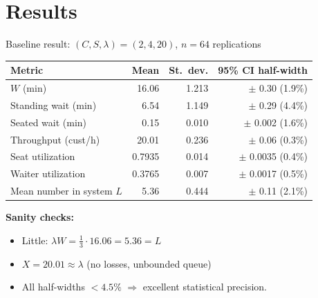 \documentclass[10pt,aspectratio=169]{beamer}
\begin{document}
\section{Results}
\begin{frame}{Baseline result: $(C,S,\lambda) = (2,4,20)$, $n = 64$ replications}
\begin{table}
\centering
\begin{tabular}{l r r r}
\toprule
Metric & Mean & St.\ dev. & 95\% CI half-width \\
\midrule
$W$ (min)                       & 16.06 & 1.213 & $\pm$ 0.30 (1.9\%) \\
Standing wait (min)             &  6.54 & 1.149 & $\pm$ 0.29 (4.4\%) \\
Seated wait (min)               &  0.15 & 0.010 & $\pm$ 0.002 (1.6\%) \\
Throughput (cust/h)             & 20.01 & 0.236 & $\pm$ 0.06 (0.3\%) \\
Seat utilization                & 0.7935 & 0.014 & $\pm$ 0.0035 (0.4\%) \\
Waiter utilization              & 0.3765 & 0.007 & $\pm$ 0.0017 (0.5\%) \\
Mean number in system $L$       &  5.36 & 0.444 & $\pm$ 0.11 (2.1\%) \\
\bottomrule
\end{tabular}
\end{table}

\vspace{0.4cm}
\textbf{Sanity checks:}
\begin{itemize}
  \item Little: $\lambda W = \tfrac{1}{3}\cdot 16.06 = 5.36 = L$ \quad\checkmark
  \item $X = 20.01 \approx \lambda$ \quad (no losses, unbounded queue) \checkmark
  \item All half-widths $< 4.5\%$ $\Rightarrow$ excellent statistical precision.
\end{itemize}
\end{frame}
\end{document}
